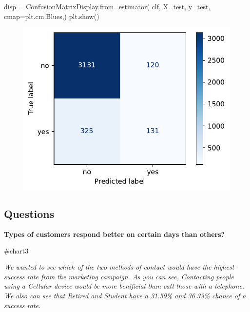 \documentclass[
  letterpaper,
  DIV=11,
  numbers=noendperiod]{scrartcl}
\newenvironment{Shaded}{\begin{snugshade}}{\end{snugshade}}
\newcommand{\CommentTok}[1]{\textcolor[rgb]{0.37,0.37,0.37}{#1}}
\newcommand{\NormalTok}[1]{\textcolor[rgb]{0.00,0.23,0.31}{#1}}
\newcommand{\OperatorTok}[1]{\textcolor[rgb]{0.37,0.37,0.37}{#1}}
\begin{document}
\begin{Shaded}
\begin{Highlighting}[]
\NormalTok{disp }\OperatorTok{=}\NormalTok{ ConfusionMatrixDisplay.from\_estimator(}
\NormalTok{  clf,}
\NormalTok{  X\_test,}
\NormalTok{  y\_test,}
\NormalTok{  cmap}\OperatorTok{=}\NormalTok{plt.cm.Blues,)}
\NormalTok{plt.show()}
\end{Highlighting}
\end{Shaded}

\begin{figure}[H]

{\centering \includegraphics{Executive-summary_files/figure-pdf/cell-4-output-1.pdf}

}

\end{figure}

\hypertarget{questions}{%
\subsection{Questions}\label{questions}}

\textbf{Types of customers respond better on certain days than others?}

\begin{Shaded}
\begin{Highlighting}[]
\CommentTok{\#chart3}
\end{Highlighting}
\end{Shaded}

\emph{We wanted to see which of the two methods of contact would have
the highest success rate from the marketing campaign. As you can see,
Contacting people using a Cellular device would be more benificial than
call those with a telephone. We also can see that Retired and Student
have a 31.59\% and 36.33\% chance of a success rate.}
\end{document}
